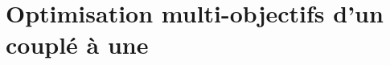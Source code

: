\documentclass[11pt, twoside, openright]{JeremyThesis}
\begin{document}
% 

% 

% 

\chapter{Optimisation multi-objectifs d’un  couplé à une }


% 
\end{document}
